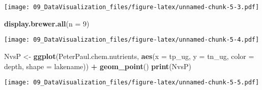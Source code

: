 \documentclass[]{article}
\newenvironment{Shaded}{\begin{snugshade}}{\end{snugshade}}
\newcommand{\DataTypeTok}[1]{\textcolor[rgb]{0.13,0.29,0.53}{#1}}
\newcommand{\DecValTok}[1]{\textcolor[rgb]{0.00,0.00,0.81}{#1}}
\newcommand{\KeywordTok}[1]{\textcolor[rgb]{0.13,0.29,0.53}{\textbf{#1}}}
\newcommand{\NormalTok}[1]{#1}
\newcommand{\OperatorTok}[1]{\textcolor[rgb]{0.81,0.36,0.00}{\textbf{#1}}}
\newcommand{\StringTok}[1]{\textcolor[rgb]{0.31,0.60,0.02}{#1}}
\begin{document}
\texttt{[image: 09\_DataVisualization\_files/figure-latex/unnamed-chunk-5-3.pdf]}

\begin{Shaded}
\begin{Highlighting}[]
\KeywordTok{display.brewer.all}\NormalTok{(}\DataTypeTok{n =} \DecValTok{9}\NormalTok{)}
\end{Highlighting}
\end{Shaded}

\texttt{[image: 09\_DataVisualization\_files/figure-latex/unnamed-chunk-5-4.pdf]}

\begin{Shaded}
\begin{Highlighting}[]
\NormalTok{NvsP <-}
\StringTok{  }\KeywordTok{ggplot}\NormalTok{(PeterPaul.chem.nutrients, }\KeywordTok{aes}\NormalTok{(}\DataTypeTok{x =}\NormalTok{ tp_ug, }\DataTypeTok{y =}\NormalTok{ tn_ug, }\DataTypeTok{color =}\NormalTok{ depth, }\DataTypeTok{shape =}\NormalTok{ lakename)) }\OperatorTok{+}
\StringTok{  }\KeywordTok{geom_point}\NormalTok{() }
\KeywordTok{print}\NormalTok{(NvsP)}
\end{Highlighting}
\end{Shaded}

\texttt{[image: 09\_DataVisualization\_files/figure-latex/unnamed-chunk-5-5.pdf]}
\end{document}
